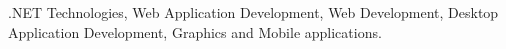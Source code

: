 
\begin{cvparagraph}

.NET Technologies, Web Application Development, Web Development, Desktop Application Development,
Graphics and Mobile applications.
 

\end{cvparagraph}
